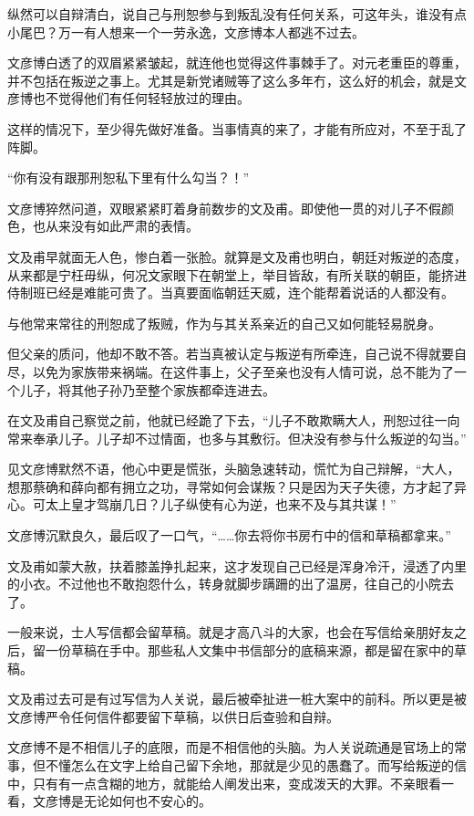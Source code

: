 纵然可以自辩清白，说自己与刑恕参与到叛乱没有任何关系，可这年头，谁没有点小尾巴？万一有人想来一个一劳永逸，文彦博本人都逃不过去。

文彦博白透了的双眉紧紧皱起，就连他也觉得这件事棘手了。对元老重臣的尊重，并不包括在叛逆之事上。尤其是新党诸贼等了这么多年冇，这么好的机会，就是文彦博也不觉得他们有任何轻轻放过的理由。

这样的情况下，至少得先做好准备。当事情真的来了，才能有所应对，不至于乱了阵脚。

“你有没有跟那刑恕私下里有什么勾当？！”

文彦博猝然问道，双眼紧紧盯着身前数步的文及甫。即使他一贯的对儿子不假颜色，也从来没有如此严肃的表情。

文及甫早就面无人色，惨白着一张脸。就算是文及甫也明白，朝廷对叛逆的态度，从来都是宁枉毋纵，何况文家眼下在朝堂上，举目皆敌，有所关联的朝臣，能挤进侍制班已经是难能可贵了。当真要面临朝廷天威，连个能帮着说话的人都没有。

与他常来常往的刑恕成了叛贼，作为与其关系亲近的自己又如何能轻易脱身。

但父亲的质问，他却不敢不答。若当真被认定与叛逆有所牵连，自己说不得就要自尽，以免为家族带来祸端。在这件事上，父子至亲也没有人情可说，总不能为了一个儿子，将其他子孙乃至整个家族都牵连进去。

在文及甫自己察觉之前，他就已经跪了下去，“儿子不敢欺瞒大人，刑恕过往一向常来奉承儿子。儿子却不过情面，也多与其敷衍。但决没有参与什么叛逆的勾当。”

见文彦博默然不语，他心中更是慌张，头脑急速转动，慌忙为自己辩解，“大人，想那蔡确和薛向都有拥立之功，寻常如何会谋叛？只是因为天子失德，方才起了异心。可太上皇才驾崩几日？儿子纵使有心为逆，也来不及与其共谋！”

文彦博沉默良久，最后叹了一口气，“……你去将你书房冇中的信和草稿都拿来。”

文及甫如蒙大赦，扶着膝盖挣扎起来，这才发现自己已经是浑身冷汗，浸透了内里的小衣。不过他也不敢抱怨什么，转身就脚步蹒跚的出了温房，往自己的小院去了。

一般来说，士人写信都会留草稿。就是才高八斗的大家，也会在写信给亲朋好友之后，留一份草稿在手中。那些私人文集中书信部分的底稿来源，都是留在家中的草稿。

文及甫过去可是有过写信为人关说，最后被牵扯进一桩大案中的前科。所以更是被文彦博严令任何信件都要留下草稿，以供日后查验和自辩。

文彦博不是不相信儿子的底限，而是不相信他的头脑。为人关说疏通是官场上的常事，但不懂怎么在文字上给自己留下余地，那就是少见的愚蠢了。而写给叛逆的信中，只有有一点含糊的地方，就能给人阐发出来，变成泼天的大罪。不亲眼看一看，文彦博是无论如何也不安心的。

